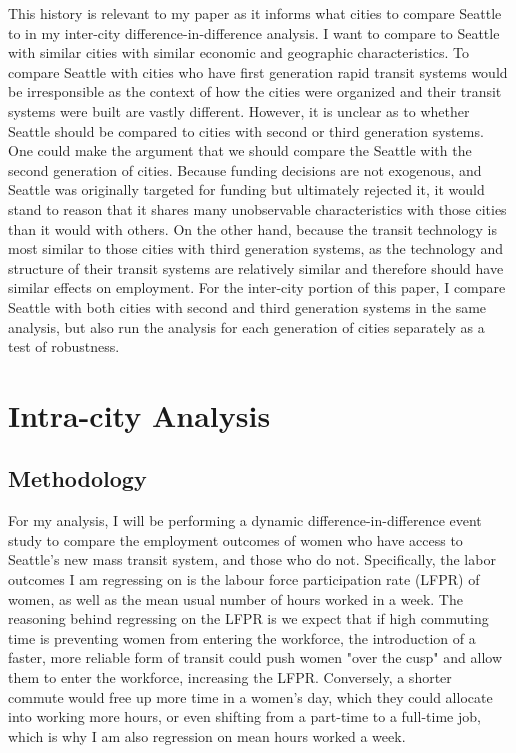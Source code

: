 \documentclass{article}
\begin{document}
This history is relevant to my paper as it informs what cities to compare Seattle to in my inter-city difference-in-difference analysis. I want to compare to Seattle with similar cities with similar economic and geographic characteristics. To compare Seattle with cities who have first generation rapid transit systems would be irresponsible as the context of how the cities were organized and their transit systems were built are vastly different. However, it is unclear as to whether Seattle should be compared to cities with second or third generation systems. One could make the argument that we should compare the Seattle with the second generation of cities. Because funding decisions are not exogenous, and Seattle was originally targeted for funding but ultimately rejected it, it would stand to reason that it shares many unobservable characteristics with those cities than it would with others. On the other hand, because the transit technology is most similar to those cities with third generation systems, as the technology and structure of their transit systems are relatively similar and therefore should have similar effects on employment. For the inter-city portion of this paper, I compare Seattle with both cities with second and third generation systems in the same analysis, but also run the analysis for each generation of cities separately as a test of robustness.\\ 

\section{Intra-city Analysis}

\subsection{Methodology}

For my analysis, I will be performing a dynamic difference-in-difference event study to compare the employment outcomes of women who have access to Seattle's new mass transit system, and those who do not. Specifically, the labor outcomes I am regressing on is the labour force participation rate (LFPR) of women, as well as the mean usual number of hours worked in a week. The reasoning behind regressing on the LFPR is we expect that if high commuting time is preventing women from entering the workforce, the introduction of a faster, more reliable form of transit could push women "over the cusp" and allow them to enter the workforce, increasing the LFPR. Conversely, a shorter commute would free up more time in a women's day, which they could allocate into working more hours, or even shifting from a part-time to a full-time job, which is why I am also regression on mean hours worked a week. \\
\end{document}
